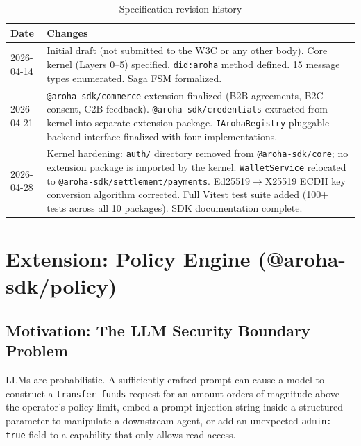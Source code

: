 \documentclass[11pt,a4paper]{article}
\begin{document}
\begin{table}[ht]
  \centering
  \renewcommand{\arraystretch}{1.4}
  \begin{tabularx}{\textwidth}{@{} l X @{}}
    \toprule
    \textbf{Date} & \textbf{Changes} \\
    \midrule
    2026-04-14
      & Initial draft (not submitted to the W3C or any other body). Core kernel (Layers 0--5)
        specified. \texttt{did:aroha} method defined. 15 message types enumerated.
        Saga FSM formalized. \\
    2026-04-21
      & \texttt{@aroha-sdk/commerce} extension finalized (B2B agreements, B2C consent,
        C2B feedback). \texttt{@aroha-sdk/credentials} extracted from kernel into
        separate extension package. \texttt{IArohaRegistry} pluggable backend
        interface finalized with four implementations. \\
    2026-04-28
      & Kernel hardening: \texttt{auth/} directory removed from \texttt{@aroha-sdk/core};
        no extension package is imported by the kernel. \texttt{WalletService}
        relocated to \texttt{@aroha-sdk/settlement/payments}. Ed25519$\to$X25519 ECDH
        key conversion algorithm corrected. Full Vitest test suite added
        (100+ tests across all 10 packages). SDK documentation complete. \\
    \bottomrule
  \end{tabularx}
  \caption{Specification revision history}
\end{table}

\section{Extension: Policy Engine (@aroha-sdk/policy)}

\subsection{Motivation: The LLM Security Boundary Problem}

LLMs are probabilistic. A sufficiently crafted prompt can cause a model to
construct a \texttt{transfer-funds} request for an amount orders of magnitude
above the operator's policy limit, embed a prompt-injection string inside a
structured parameter to manipulate a downstream agent, or add an unexpected
\texttt{admin: true} field to a capability that only allows read access.
\end{document}
